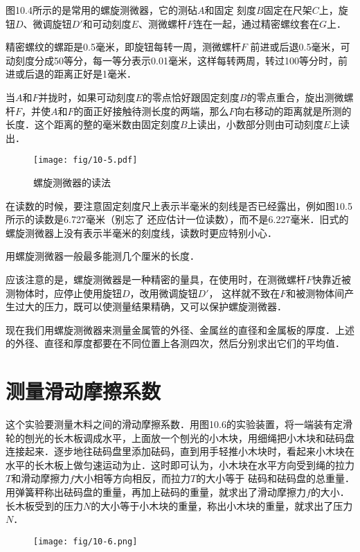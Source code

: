 图10.4所示的是常用的螺旋测微器，它的测砧$A$和固定
刻度$B$固定在尺架$C$上，旋钮$D$、微调旋钮$D'$和可动刻度$E$、测微螺杆$F$连在一起，通过精密螺纹套在$G$上．

精密螺纹的螺距是0.5毫米，即旋钮每转一周，测微螺杆$F$ 前进或后退0.5毫米，可动刻度分成50等分，每一等分表示0.01毫米，这样每转两周，转过100等分时，前进或后退的距离正好是1毫米．

当$A$和$F$并拢时，如果可动刻度$E$的零点恰好跟固定刻度$B$的零点重合，旋出测微螺杆$F$，并使$A$和$F$的面正好接触待测长度的两端，那么$F$向右移动的距离就是所测的长度．这个距离的整的毫米数由固定刻度$B$上读出，小数部分则由可动刻度$E$上读出．
\begin{figure}[htp]
    \centering
    \texttt{[image: fig/10-5.pdf]}
    \caption{螺旋测微器的读法}
\end{figure}

在读数的时候，要注意固定刻度尺上表示半毫米的刻线是否已经露出，例如图10.5所示的读数是6.727毫米（别忘了	
还应估计一位读数），而不是6.227毫米．旧式的螺旋测微器上没有表示半毫米的刻度线，读数时更应特别小心．

用螺旋测微器一般最多能测几个厘米的长度．

应该注意的是，螺旋测微器是一种精密的量具，在使用时，在测微螺杆$F$快靠近被测物体时，应停止使用旋钮$D$，改用微调旋钮$D'$， 这样就不致在$F$和被测物体间产生过大的压力，既可以使测量结果精确，又可以保护螺旋测微器．

现在我们用螺旋测微器来测量金属管的外径、金属丝的直径和金属板的厚度．上述的外径、直径和厚度都要在不同位置上各测四次，然后分别求出它们的平均值．

\section{测量滑动摩擦系数}

这个实验要测量木料之间的滑动摩擦系数．用图10.6的实验装置，将一端装有定滑轮的刨光的长木板调成水平，上面放一个刨光的小木块，用细绳把小木块和砝码盘连接起来．逐步地往砝码盘里添加砝码，直到用手轻推小木块时，看起来小木块在水平的长木板上做匀速运动为止．这时即可认为，小木块在水平方向受到绳的拉力$T$和滑动摩擦力$f$大小相等方向相反，而拉力$T$的大小等于	
砝码和砝码盘的总重量．用弹簧秤称出砝码盘的重量，再加上砝码的重量，就求出了滑动摩擦力$f$的大小．长木板受到的压力$N$的大小等于小木块的重量，称出小木块的重量，就求出了压力$N$．
\begin{figure}[htp]\centering
\texttt{[image: fig/10-6.png]}
\caption{}
\end{figure}

